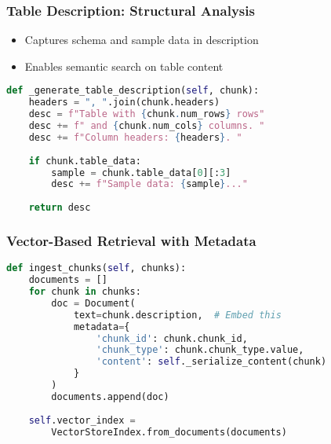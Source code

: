 \begin{frame}[fragile]\frametitle{Table Description: Structural Analysis}

\begin{itemize}
\item Captures schema and sample data in description
\item Enables semantic search on table content
\end{itemize}


\begin{lstlisting}[language=Python, basicstyle=\tiny]
def _generate_table_description(self, chunk):
    headers = ", ".join(chunk.headers)
    desc = f"Table with {chunk.num_rows} rows"
    desc += f" and {chunk.num_cols} columns. "
    desc += f"Column headers: {headers}. "
    
    if chunk.table_data:
        sample = chunk.table_data[0][:3]
        desc += f"Sample data: {sample}..."
    
    return desc
\end{lstlisting}

\end{frame}

\begin{frame}[fragile]\frametitle{Vector-Based Retrieval with Metadata}
\begin{lstlisting}[language=Python, basicstyle=\tiny]
def ingest_chunks(self, chunks):
    documents = []
    for chunk in chunks:
        doc = Document(
            text=chunk.description,  # Embed this
            metadata={
                'chunk_id': chunk.chunk_id,
                'chunk_type': chunk.chunk_type.value,
                'content': self._serialize_content(chunk)
            }
        )
        documents.append(doc)
    
    self.vector_index = 
        VectorStoreIndex.from_documents(documents)
\end{lstlisting}
\end{frame}

